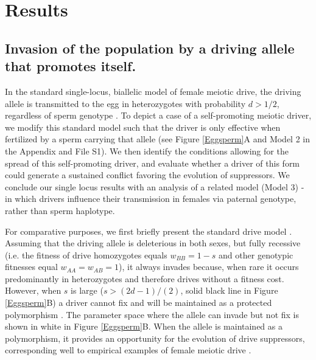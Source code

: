 \documentclass[12pt,letterpaper]{article}
\begin{document}
\section*{Results}

\subsection*{Invasion of the population by a driving allele that promotes itself.}

In the standard single-locus, biallelic model of female meiotic drive,
the driving allele is transmitted to the egg in heterozygotes with
probability  $d > 1/2$, regardless of sperm genotype \cite[e.g. ][ and see Model 1 in the Appendix for more details]{Ubeda2004}. 
 To depict a case of a self-promoting meiotic driver,  we modify this standard model such 
	that the driver is only effective when fertilized by a sperm
        carrying that allele (see Figure \ref{Eggsperm}A and Model 2
        in the Appendix and File S1). 
We then identify the conditions allowing for the spread of this self-promoting driver, 
	and evaluate whether a driver of this form could generate a sustained conflict favoring the evolution of suppressors. 
We conclude our single locus results with an analysis of a related model (Model 3) - in which
drivers influence their transmission in females via paternal genotype,
rather than sperm haplotype. \newline 

For comparative purposes, we first briefly present the standard drive model 
	\citep[see e.g. ][ for additional results]{Prout1973,Ubeda2004}. 
Assuming that the driving allele is deleterious in both sexes, but fully recessive 
	(i.e. the fitness of drive homozygotes equals $w_{BB}=1-s$ and other genotypic fitnesses equal $w_{AA}=w_{AB}=1$), 
	it always invades because,  when rare it occurs predominantly in heterozygotes and therefore drives without a fitness cost. 
However, when $s$ is large ($s>(2d-1)/(2)$, solid black line in Figure \ref{Eggsperm}B) a driver cannot fix and
will be maintained as a protected polymorphism \citep{Prout1973}. 
The parameter space where the allele can invade but not fix is shown in white
        in Figure \ref{Eggsperm}B. %
When the allele is maintained as a polymorphism, it provides an opportunity for the evolution of
	drive suppressors, corresponding well to empirical examples of
        female meiotic drive \citep[reviewed in ][]{Burt2006}. \newline 
\end{document}
